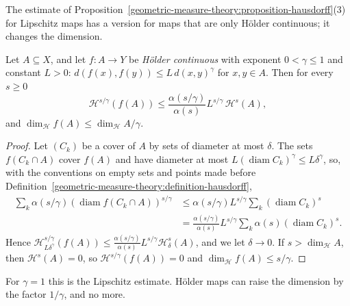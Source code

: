 The estimate of Proposition~\ref{geometric-measure-theory:proposition-hausdorff}(3) for Lipschitz maps has a version for maps that are only H\"older continuous; it changes the dimension.

\begin{proposition}\label{geometric-measure-theory:proposition-holder-images}
Let $A \subseteq X$, and let $f \colon A \to Y$ be \emph{H\"older continuous} with exponent $0 < \gamma \leq 1$ and constant $L > 0$: $d(f(x), f(y)) \leq L\,d(x, y)^\gamma$ for $x, y \in A$. Then for every $s \geq 0$
\[
\mathcal{H}^{s/\gamma}(f(A)) \leq \frac{\alpha(s/\gamma)}{\alpha(s)}L^{s/\gamma}\,\mathcal{H}^s(A),
\]
and $\dim_{\mathcal{H}}f(A) \leq \dim_{\mathcal{H}}A/\gamma$.
\end{proposition}

\begin{proof}
Let $(C_k)$ be a cover of $A$ by sets of diameter at most $\delta$. The sets $f(C_k \cap A)$ cover $f(A)$ and have diameter at most $L(\operatorname{diam}C_k)^\gamma \leq L\delta^\gamma$, so, with the conventions on
empty sets and points made before Definition~\ref{geometric-measure-theory:definition-hausdorff},
\[\begin{aligned}
\sum_k\alpha(s/\gamma)(\operatorname{diam}f(C_k \cap A))^{s/\gamma} &\leq \alpha(s/\gamma)L^{s/\gamma}\sum_k(\operatorname{diam}C_k)^s \\
&= \frac{\alpha(s/\gamma)}{\alpha(s)}L^{s/\gamma}\sum_k\alpha(s)(\operatorname{diam}C_k)^s .
\end{aligned}\]
Hence $\mathcal{H}^{s/\gamma}_{L\delta^\gamma}(f(A)) \leq \frac{\alpha(s/\gamma)}{\alpha(s)}L^{s/\gamma}\mathcal{H}^s_\delta(A)$, and we let $\delta \to 0$. If $s > \dim_{\mathcal{H}}A$, then $\mathcal{H}^s(A) = 0$, so
$\mathcal{H}^{s/\gamma}(f(A)) = 0$ and $\dim_{\mathcal{H}}f(A) \leq s/\gamma$.
\end{proof}

For $\gamma = 1$ this is the Lipschitz estimate. H\"older maps can raise the dimension by the factor $1/\gamma$, and no more.

